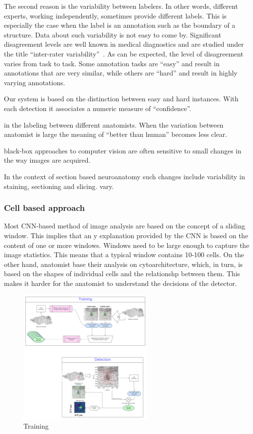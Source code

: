 \documentclass[runningheads]{llncs}
\begin{document}
The second reason is the variability between labelers. In other words,
different experts, working independently, sometimes provide different
labels. This is especially the case when the label is an annotation
such as the boundary of a structure. Data about such variability is
not easy to come by. Significant disagreement levels are well known in
medical diagnostics and are studied under the title ``inter-rater
variability''~\cite{gellhorn2013inter}. As can be expected, the level
of disagreement varies from task to task. Some annotation tasks are
``easy'' and result in annotations that are very similar, while others
are ``hard'' and result in highly varying annotations.

Our system is based on the distinction between easy and hard
instances. With each detection it associates a numeric measure of
``confidence''.


in the labeling between different anatomists. When the variation
between anatomist is large the meaning of ``better than human''
becomes less clear.


black-box approaches to computer vision
are often sensitive to small changes in the way images are acquired.

In the context of section based neuroanatomy such changes include
variability in staining, sectioning and slicing.
vary.

\subsubsection{Cell based approach}  Most CNN-based method of image
analysis are based on the concept of a sliding window. This implies
that an
y explanation provided by the CNN is based on the content of one or more windows. Windows need to be large enough to capture the image statistics. This means that a typical window contains 10-100 cells.
On the other hand, anatomist base their analysis on cytoarchitecture, which, in turn, is based on the shapes of individual cells and the relationshp between them. This makes it harder for the anatomist to understand the decisions of the detector.
\begin{figure}
  \centering
  \includegraphics[width=0.6\textwidth]{figures/Training.pdf}
  \caption{Training \label{fig:training}}
\end{figure}
\end{document}
